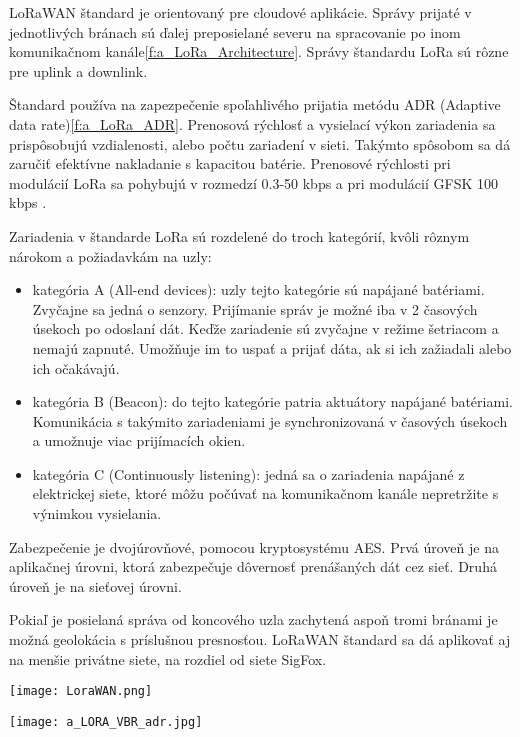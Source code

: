 \documentclass[12pt,a4wide,oneside,openright]{report}
\begin{document}
LoRaWAN štandard je orientovaný pre cloudové aplikácie. Správy prijaté v jednotlivých bránach sú ďalej preposielané severu na spracovanie po inom komunikačnom kanále\ref{f:a_LoRa_Architecture}.
Správy štandardu LoRa sú rôzne pre uplink a downlink.

Štandard používa na zapezpečenie spoľahlivého prijatia metódu ADR (Adaptive data rate)\ref{f:a_LoRa_ADR}. Prenosová rýchlosť a vysielací výkon zariadenia sa prispôsobujú vzdialenosti, alebo počtu zariadení v sieti. Takýmto spôsobom sa dá zaručiť efektívne nakladanie s kapacitou batérie. Prenosové rýchlosti pri modulácií LoRa sa pohybujú v rozmedzí 0.3-50 kbps a pri modulácií GFSK 100 kbps \cite{LoRaFAQ}.

Zariadenia v štandarde LoRa sú rozdelené do troch kategórií, kvôli rôznym nárokom a požiadavkám na uzly:
\begin{itemize}
	\item kategória A (All-end devices): uzly tejto kategórie sú napájané batériami. Zvyčajne sa jedná o senzory. Prijímanie správ je možné iba v 2 časových úsekoch po odoslaní dát. Keďže zariadenie sú zvyčajne v režime šetriacom a nemajú zapnuté. Umožňuje im to uspať a prijať dáta, ak si ich zažiadali alebo ich očakávajú.
	\item kategória B (Beacon): do tejto kategórie patria aktuátory napájané batériami. Komunikácia s takýmito zariadeniami je synchronizovaná v časových úsekoch a umožnuje viac prijímacích okien.
	\item kategória C (Continuously listening): jedná sa o zariadenia napájané z elektrickej siete, ktoré môžu počúvať na komunikačnom kanále nepretržite s výnimkou vysielania.
\end{itemize}

Zabezpečenie je dvojúrovňové, pomocou kryptosystému AES. Prvá úroveň je na aplikačnej úrovni, ktorá zabezpečuje dôvernosť prenášaných dát cez sieť. Druhá úroveň je na sieťovej úrovni.

Pokiaľ je posielaná správa od koncového uzla zachytená aspoň tromi bránami je možná geolokácia s príslušnou presnosťou. LoRaWAN štandard sa dá aplikovať aj na menšie privátne siete, na rozdiel od siete SigFox.

\begin{figure*}[!htb]
	\centering
	\texttt{[image: LoraWAN.png]}
	\caption{Architektúra LoRaWAN\cite{LoRaOverview}.}
	\label{f:a_LoRaWAN}
\end{figure*}


\begin{figure*}[!htb]
	\centering
	\texttt{[image: a\_LORA\_VBR\_adr.jpg]}
	\caption{Prispôsobovanie výkonu a prenosovej rýchlosti v závislosti od vzdialenosti komunikujúcich uzlov.\cite{LoRa_VBR}}
	\label{f:a_LoRa_ADR}
\end{figure*}
\end{document}
